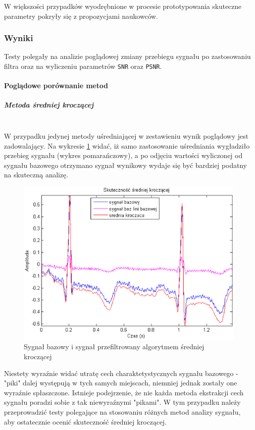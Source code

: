 \documentclass[a4paper, 11pt]{article}
\begin{document}
W większości przypadków wyodrębnione w procesie prototypowania skuteczne parametry pokryły się z propozycjami naukowców.

\subsubsection{Wyniki}
\label{sec:baseline:results}
Testy polegały na analizie poglądowej zmiany przebiegu sygnału po zastosowaniu filtra oraz na wyliczeniu parametrów \verb|SNR| oraz \verb|PSNR|.

\paragraph{Poglądowe porównanie metod}
\subparagraph{Metoda średniej kroczącej}
\mbox{} \\
W przypadku jedynej metody uśredniającej w zestawieniu wynik poglądowy jest zadowalający. Na wykresie \ref{fig:fig_srednia} widać, iż samo zastosowanie uśredniania wygładziło przebieg sygnału (wykres pomarańczowy), a po odjęciu wartości wyliczonej od sygnału bazowego otrzymano sygnał wynikowy wydaje się być bardziej podatny na skuteczną analizę.\\

\begin{figure}[h]
\centering
\includegraphics[scale=0.8]{include/fig_srednia.eps}
\caption{Sygnał bazowy i sygnał przefiltrowany algorytmem średniej kroczącej}
\label{fig:fig_srednia}
\end{figure}

Niestety wyraźnie widać utratę cech charaktetystycznych sygnału bazowego - "piki" dalej występują w tych samych miejscach, niemniej jednak zostały one wyraźnie spłaszczone. Istnieje podejrzenie, że nie każda metoda ekstrakcji cech sygnału poradzi sobie z tak niewyraźnymi "pikami". W tym przypadku należy przeprowadzić testy polegające na stosowaniu różnych metod analizy sygnału, aby ostatecznie ocenić skuteczność średniej kroczącej.
\end{document}
